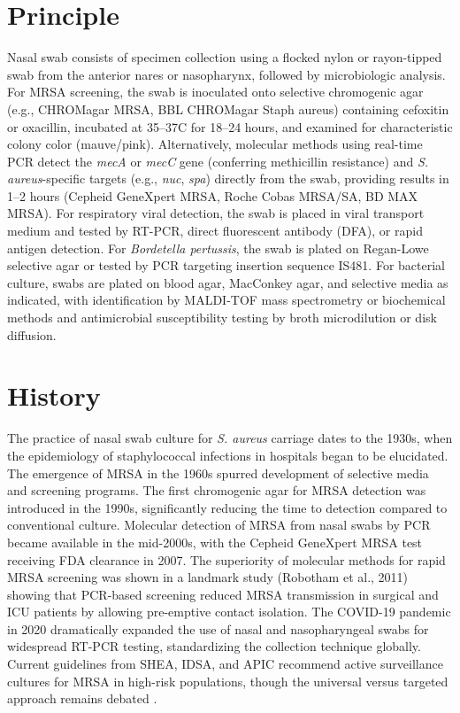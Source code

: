 \section*{Principle}
Nasal swab consists of specimen collection using a flocked nylon or rayon-tipped swab from the anterior nares or nasopharynx, followed by microbiologic analysis. For MRSA screening, the swab is inoculated onto selective chromogenic agar (e.g., CHROMagar MRSA, BBL CHROMagar Staph aureus) containing cefoxitin or oxacillin, incubated at 35--37\textdegree{}C for 18--24 hours, and examined for characteristic colony color (mauve/pink). Alternatively, molecular methods using real-time PCR detect the \textit{mecA} or \textit{mecC} gene (conferring methicillin resistance) and \textit{S. aureus}-specific targets (e.g., \textit{nuc}, \textit{spa}) directly from the swab, providing results in 1--2 hours (Cepheid GeneXpert MRSA, Roche Cobas MRSA/SA, BD MAX MRSA). For respiratory viral detection, the swab is placed in viral transport medium and tested by RT-PCR, direct fluorescent antibody (DFA), or rapid antigen detection. For \textit{Bordetella pertussis}, the swab is plated on Regan-Lowe selective agar or tested by PCR targeting insertion sequence IS481. For bacterial culture, swabs are plated on blood agar, MacConkey agar, and selective media as indicated, with identification by MALDI-TOF mass spectrometry or biochemical methods and antimicrobial susceptibility testing by broth microdilution or disk diffusion.

\section*{History}
The practice of nasal swab culture for \textit{S. aureus} carriage dates to the 1930s, when the epidemiology of staphylococcal infections in hospitals began to be elucidated. The emergence of MRSA in the 1960s spurred development of selective media and screening programs. The first chromogenic agar for MRSA detection was introduced in the 1990s, significantly reducing the time to detection compared to conventional culture. Molecular detection of MRSA from nasal swabs by PCR became available in the mid-2000s, with the Cepheid GeneXpert MRSA test receiving FDA clearance in 2007. The superiority of molecular methods for rapid MRSA screening was shown in a landmark study (Robotham et al., 2011) showing that PCR-based screening reduced MRSA transmission in surgical and ICU patients by allowing pre-emptive contact isolation. The COVID-19 pandemic in 2020 dramatically expanded the use of nasal and nasopharyngeal swabs for widespread RT-PCR testing, standardizing the collection technique globally. Current guidelines from SHEA, IDSA, and APIC recommend active surveillance cultures for MRSA in high-risk populations, though the universal versus targeted approach remains debated \cite{calfee2014strategies}.

